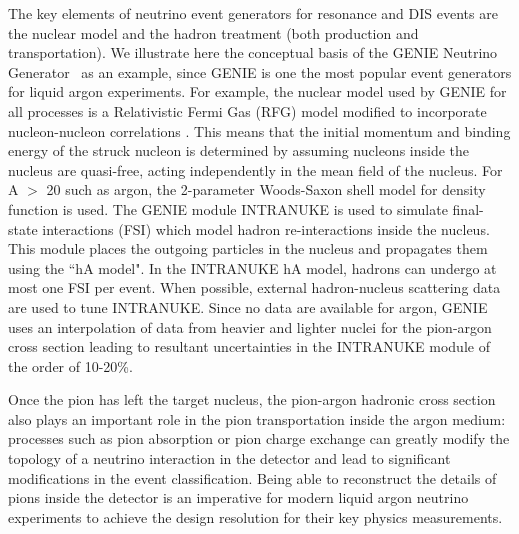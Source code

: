 


The key elements of  neutrino event generators for resonance and DIS events are the nuclear model and the hadron treatment (both production and transportation).  We illustrate here the conceptual basis of the GENIE Neutrino Generator~\cite{Andreopoulos:2009rq} as an example, since GENIE is one the most popular event generators for liquid argon experiments.
For example, the nuclear model used by GENIE for all processes is a Relativistic Fermi Gas (RFG) model modified to incorporate nucleon-nucleon correlations \cite{PhysRevD.24.1400}. This means that the initial momentum and binding energy of the struck nucleon is determined by assuming nucleons inside the nucleus are quasi-free, acting independently in the mean field of the nucleus. For A $ >$ 20 such as argon, the 2-parameter Woods-Saxon shell model for density function is used.  The GENIE module INTRANUKE \cite{Juszczak2006} is used to simulate final-state interactions (FSI) which model  hadron re-interactions inside the nucleus. This module places the outgoing particles in the nucleus and propagates them using the ``hA model".  In the INTRANUKE hA model, hadrons can undergo at most one FSI per event. When possible, external hadron-nucleus scattering data are used to tune INTRANUKE. Since no data are available for argon, GENIE uses an interpolation of data from heavier and lighter nuclei for the pion-argon cross section leading to resultant uncertainties in the INTRANUKE module of the order of 10-20\%.
 
Once the pion has left the target nucleus, the pion-argon hadronic cross section also plays an important role in the pion transportation inside the argon medium: processes such as pion absorption or pion charge exchange can greatly modify the topology of a neutrino interaction	 in the detector and lead to significant modifications in the event classification.
Being able to reconstruct the details of pions inside the detector is an imperative for modern liquid argon neutrino experiments to achieve the design resolution for their key physics measurements.



